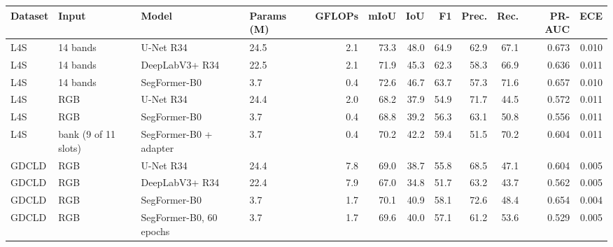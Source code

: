 \begin{tabular}{llllrrrrrrrr}
\toprule
Dataset & Input & Model & Params (M) & GFLOPs & mIoU & IoU & F1 & Prec. & Rec. & PR-AUC & ECE \\
\midrule
L4S & 14 bands & U-Net R34 & 24.5 & 2.1 & 73.3 & 48.0 & 64.9 & 62.9 & 67.1 & 0.673 & 0.010 \\
L4S & 14 bands & DeepLabV3+ R34 & 22.5 & 2.1 & 71.9 & 45.3 & 62.3 & 58.3 & 66.9 & 0.636 & 0.011 \\
L4S & 14 bands & SegFormer-B0 & 3.7 & 0.4 & 72.6 & 46.7 & 63.7 & 57.3 & 71.6 & 0.657 & 0.010 \\
L4S & RGB & U-Net R34 & 24.4 & 2.0 & 68.2 & 37.9 & 54.9 & 71.7 & 44.5 & 0.572 & 0.011 \\
L4S & RGB & SegFormer-B0 & 3.7 & 0.4 & 68.8 & 39.2 & 56.3 & 63.1 & 50.8 & 0.556 & 0.011 \\
L4S & bank (9 of 11 slots) & SegFormer-B0 + adapter & 3.7 & 0.4 & 70.2 & 42.2 & 59.4 & 51.5 & 70.2 & 0.604 & 0.011 \\
GDCLD & RGB & U-Net R34 & 24.4 & 7.8 & 69.0 & 38.7 & 55.8 & 68.5 & 47.1 & 0.604 & 0.005 \\
GDCLD & RGB & DeepLabV3+ R34 & 22.4 & 7.9 & 67.0 & 34.8 & 51.7 & 63.2 & 43.7 & 0.562 & 0.005 \\
GDCLD & RGB & SegFormer-B0 & 3.7 & 1.7 & 70.1 & 40.9 & 58.1 & 72.6 & 48.4 & 0.654 & 0.004 \\
GDCLD & RGB & SegFormer-B0, 60 epochs & 3.7 & 1.7 & 69.6 & 40.0 & 57.1 & 61.2 & 53.6 & 0.529 & 0.005 \\
\bottomrule
\end{tabular}
